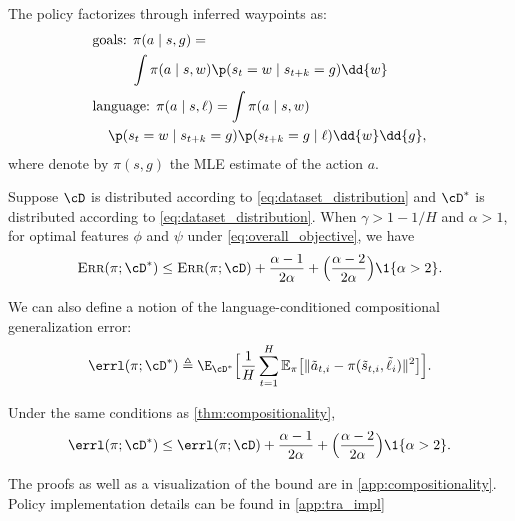 \begin{rebuttal}
                            
    \begin{assumption}
        \label{asm:policy_factorization}
        The policy factorizes through inferred waypoints as:
\begin{align}
    &\textrm{goals: }\pi(a \mid s, g)
        = \nonumber\\*
      &\mspace{50mu} \int \pi(a\mid s, w) \p(s_{t}=w \mid s_{t+k}=g) \dd{w}
        \label{eq:goal-conditioned} \\
    &\textrm{language: } \pi(a \mid s, \ell)
        = \int \pi(a\mid s, w) \nonumber\\*
      &\mspace{20mu} \p(s_{t}=w \mid s_{t+k}=g) \p(s_{t+k}=g \mid \ell) \dd{w} \dd{g} ,
        \label{eq:language-conditioned}
        \end{align}
        where denote by $\pi(s,g)$ the MLE estimate of the action $a$.

    \end{assumption}

    \makerestatable
    \begin{theorem}
        \label{thm:compositionality}
        Suppose $\cD$ is distributed according to \cref{eq:dataset_distribution} and $\cD^{*}$ is distributed according to \cref{eq:dataset_distribution}.
        When $\gamma > 1-1/H$ and $\alpha > 1$, for optimal features $\phi$ and $\psi$ under \cref{eq:overall_objective}, we have
        \begin{gather}
            \textsc{Err}(\pi; \cD^{*}) \le \textsc{Err}(\pi; \cD) +  \frac{\alpha -1}{2 \alpha }+\Bigl(\frac{ \alpha - 2 }{2\alpha}\Bigr) \1 \{\alpha >2\}  .
            \label{eq:compositionality}
        \end{gather}
    \end{theorem}

    We can also define a notion of the language-conditioned compositional generalization error:
    \begin{equation*}
        \errl(\pi; \cD^{*}) \triangleq \E_{\cD^{*}}\Bigl[\frac{1}{H}\sum_{t=1}^{H}
            \mathbb{E}_{\pi}\bigl[\|\tilde{a}_{t,i} - \pi(\tilde{s}_{t,i}, \tilde{\ell}_{i})\|^{2}\bigr]\Bigr].
            \label{eq:language_error}
    \end{equation*}

    \makerestatable
    \begin{corollary}
        \label{thm:language}
        Under the same conditions as \cref{thm:compositionality},
        \begin{equation*}
            \errl(\pi; \cD^{*}) \le \errl(\pi; \cD) +  \frac{\alpha -1}{2 \alpha }+\Bigl(\frac{ \alpha - 2 }{2\alpha}\Bigr) \1 \{\alpha >2\}  .
            \label{eq:compositionality_language}
        \end{equation*}

    \end{corollary}

    The proofs as well as a visualization of the bound are in \cref{app:compositionality}. Policy implementation details can be found in \cref{app:tra_impl}

    
                
        
    \end{rebuttal}
